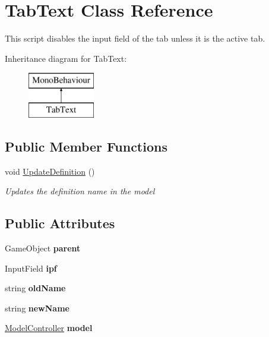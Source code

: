 \hypertarget{class_tab_text}{}\section{Tab\+Text Class Reference}
\label{class_tab_text}


This script disables the input field of the tab unless it is the active tab.  


Inheritance diagram for Tab\+Text\+:\begin{figure}[H]
\begin{center}
\leavevmode
\includegraphics[height=2.000000cm]{class_tab_text}
\end{center}
\end{figure}
\subsection*{Public Member Functions}
\begin{DoxyCompactItemize}
\item 
void \hyperlink{class_tab_text_a10061d722257289b90501c8251fa2d1a}{Update\+Definition} ()
\begin{DoxyCompactList}\small\item\em Updates the definition name in the model \end{DoxyCompactList}\end{DoxyCompactItemize}
\subsection*{Public Attributes}
\begin{DoxyCompactItemize}
\item 
\mbox{\label{class_tab_text_aaa83367064d26906556fb752b7c4fbd7}} 
Game\+Object {\bfseries parent}
\item 
\mbox{\label{class_tab_text_af59e01ebf1860ac451b686d5fd51e8af}} 
Input\+Field {\bfseries ipf}
\item 
\mbox{\label{class_tab_text_ada044dfae3469e4db4845e24c140cdfb}} 
string {\bfseries old\+Name}
\item 
\mbox{\label{class_tab_text_a49910f80dd10d636e8c96e0f99897e27}} 
string {\bfseries new\+Name}
\item 
\mbox{\label{class_tab_text_ac3068749828c914f91f3952a85441196}} 
\hyperlink{class_model_controller}{Model\+Controller} {\bfseries model}
\end{DoxyCompactItemize}


